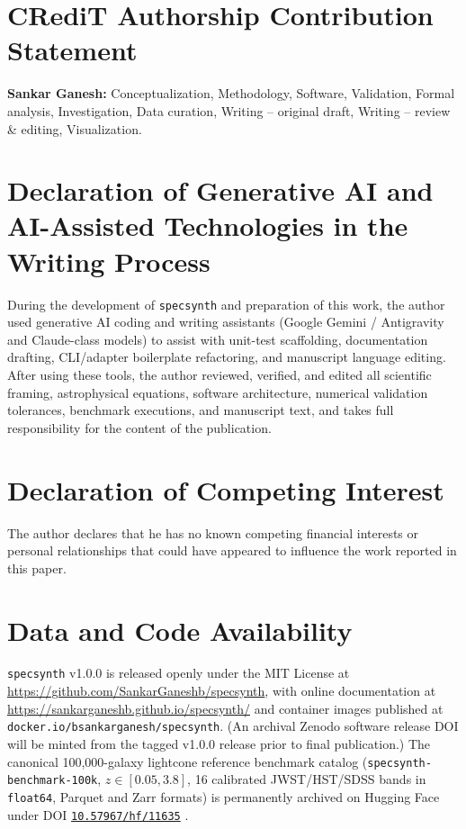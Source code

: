 \documentclass[preprint,12pt,authoryear]{elsarticle}
\begin{document}
\section*{CRediT Authorship Contribution Statement}
\textbf{Sankar Ganesh:} Conceptualization, Methodology, Software, Validation, Formal analysis, Investigation, Data curation, Writing -- original draft, Writing -- review \& editing, Visualization.

\section*{Declaration of Generative AI and AI-Assisted Technologies in the Writing Process}
During the development of \texttt{specsynth} and preparation of this work, the author used generative AI coding and writing assistants (Google Gemini / Antigravity and Claude-class models) to assist with unit-test scaffolding, documentation drafting, CLI/adapter boilerplate refactoring, and manuscript language editing. After using these tools, the author reviewed, verified, and edited all scientific framing, astrophysical equations, software architecture, numerical validation tolerances, benchmark executions, and manuscript text, and takes full responsibility for the content of the publication.

\section*{Declaration of Competing Interest}
The author declares that he has no known competing financial interests or personal relationships that could have appeared to influence the work reported in this paper.

\section*{Data and Code Availability}
\texttt{specsynth} v1.0.0 is released openly under the MIT License at \url{https://github.com/SankarGaneshb/specsynth}, with online documentation at \url{https://sankarganeshb.github.io/specsynth/} and container images published at \texttt{docker.io/bsankarganesh/specsynth}. (An archival Zenodo software release DOI will be minted from the tagged v1.0.0 release prior to final publication.) The canonical 100,000-galaxy lightcone reference benchmark catalog (\texttt{specsynth-benchmark-100k}, $z\in[0.05, 3.8]$, 16 calibrated JWST/HST/SDSS bands in \texttt{float64}, Parquet and Zarr formats) is permanently archived on Hugging Face under DOI \href{https://doi.org/10.57967/hf/11635}{\texttt{10.57967/hf/11635}} \citep{sankar_ganesh_bala_krishnan_2026}.
\end{document}
